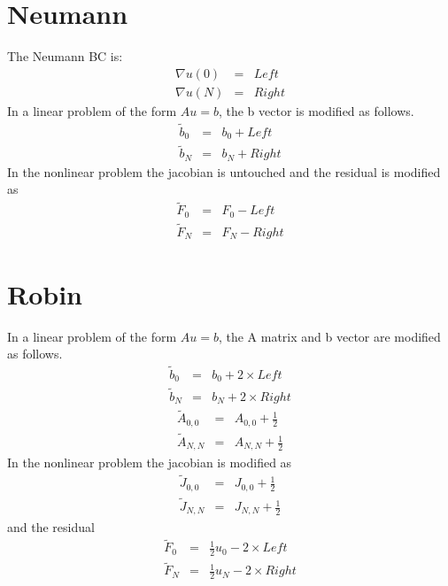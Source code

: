 \documentclass[12pt]{article}
\begin{document}
\maketitle
\section{Neumann}
The Neumann BC is:
\begin{eqnarray}
\nabla u(0) & = & Left \\
\nabla u(N) & = & Right
\end{eqnarray}
In a linear problem of the form $A u = b$, the b vector is modified as follows.
\begin{eqnarray}
\tilde{b}_0 & = & b_0 + Left\\
\tilde{b}_N & = & b_N + Right
\end{eqnarray}
In the nonlinear problem the jacobian is untouched and the residual is modified as
\begin{eqnarray}
\tilde{F}_0 & = & F_0 - Left\\ 
\tilde{F}_N & = & F_N - Right 
\end{eqnarray}
\section{Robin}
In a linear problem of the form $A u = b$, the A matrix and b vector are modified as follows.
\begin{eqnarray}
\tilde{b}_0 & = & b_0 + 2\times Left\\
\tilde{b}_N & = & b_N + 2\times Right
\end{eqnarray}
\begin{eqnarray}
\tilde{A}_{0,0} & = & A_{0,0} + \frac{1}{2}\\
\tilde{A}_{N,N} & = & A_{N,N} + \frac{1}{2}
\end{eqnarray}
In the nonlinear problem the jacobian is modified as
\begin{eqnarray}
\tilde{J}_{0,0} & = & J_{0,0} + \frac{1}{2}\\
\tilde{J}_{N,N} & = & J_{N,N} + \frac{1}{2}
\end{eqnarray}
and the residual
\begin{eqnarray}
\tilde{F}_{0} & = & \frac{1}{2} u_0 - 2\times Left\\
\tilde{F}_{N} & = & \frac{1}{2} u_N - 2\times Right
\end{eqnarray}
\end{document}
